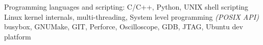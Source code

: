 \documentclass[10pt,a4paper]{article} %
\begin{document}
\spacedhrule{1.6em}{-0.4em} %



\inlineheadsection %
{Programming languages and scripting:} {C/C++, Python, UNIX shell scripting}
 {Linux kernel internals, multi-threading, System level programming \textit{(POSIX API)}}
 {busybox, GNUMake, GIT, Perforce, Oscilloscope, GDB, JTAG, Ubuntu dev platform}
{}

%

\spacedhrule{1.6em}{-0.4em} %

\end{document}
